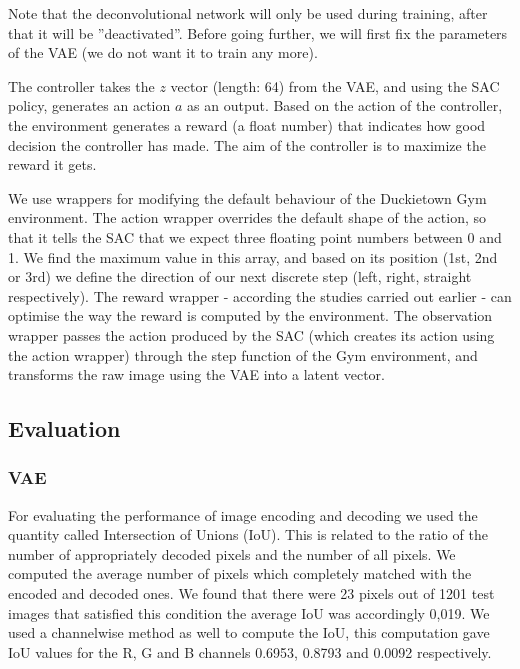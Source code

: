 \documentclass{article}
\begin{document}
Note that the deconvolutional network will only be used during training, after that it will be ''deactivated''. Before going further, we will first fix the parameters of the VAE (we do not want it to train any more).

The controller takes the $z$ vector (length: 64) from the VAE, and using the SAC policy, generates an action $a$ as an output. Based on the action of the controller, the environment generates a reward (a float number) that indicates how good decision the controller has made. The aim of the controller is to maximize the reward it gets.

We use wrappers for modifying the default behaviour of the Duckietown Gym environment. The action wrapper overrides the default shape of the action, so that it tells the SAC that we expect three floating point numbers between 0 and 1. We find the maximum value in this array, and based on its position (1st, 2nd or 3rd) we define the direction of our next discrete step (left, right, straight respectively). The reward wrapper - according the studies carried out earlier - can optimise the way the reward is computed by the environment. The observation wrapper passes the action produced by the SAC (which creates its action using the action wrapper) through the step function of the Gym environment, and transforms the raw image using the VAE into a latent vector.


\subsection{Evaluation}

\subsubsection{VAE}
For evaluating the performance of image encoding and decoding we used the quantity called Intersection of Unions (IoU). This is related to the ratio of the number of appropriately decoded pixels and the number of all pixels. We computed the average number of pixels which completely matched with the encoded and decoded ones. We found that there were 23 pixels out of 1201 test images that satisfied this condition the average IoU was accordingly 0,019. We used a channelwise method as well to compute the IoU, this computation gave IoU values for the R, G and B channels 0.6953, 0.8793 and 0.0092 respectively.
\end{document}
